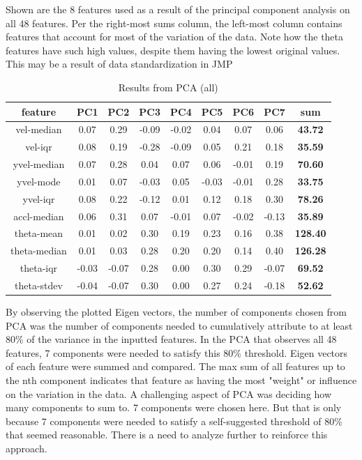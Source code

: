 \begin{table}[h!]
	\centering
	\caption{Results from PCA (all)}
	{\small Shown are the 8 features used as a result of the principal component analysis on all 48 features. Per the right-most sums column, the left-most column contains features that account for most of the variation of the data. Note how the theta features have such high values, despite them having the lowest original values. This may be a result of data standardization in JMP}
	\bigskip
	\label{tab:pca-all-results}
	\begin{tabular}{|c|c|c|c|c|c|c|c|c|}
		\hline
		\textbf{feature} & \textbf{PC1} & \textbf{PC2} & \textbf{PC3} & \textbf{PC4} & \textbf{PC5} & \textbf{PC6} & \textbf{PC7} & \textbf{sum} \\
		\hline
		vel-median & 0.07 & 0.29 & -0.09 & -0.02 & 0.04 & 0.07 & 0.06 & \textbf{43.72} \\
		vel-iqr & 0.08 & 0.19 & -0.28 & -0.09 & 0.05 & 0.21 & 0.18 & \textbf{35.59} \\
		yvel-median & 0.07 & 0.28 & 0.04 & 0.07 & 0.06 & -0.01 & 0.19 & \textbf{70.60} \\
		yvel-mode & 0.01 & 0.07 & -0.03 & 0.05 & -0.03 & -0.01 & 0.28 & \textbf{33.75} \\
		yvel-iqr & 0.08 & 0.22 & -0.12 & 0.01 & 0.12 & 0.18 & 0.30 & \textbf{78.26} \\
		accl-median & 0.06 & 0.31 & 0.07 & -0.01 & 0.07 & -0.02 & -0.13 & \textbf{35.89} \\
		theta-mean & 0.01 & 0.02 & 0.30 & 0.19 & 0.23 & 0.16 & 0.38 & \textbf{128.40} \\
		theta-median & 0.01 & 0.03 & 0.28 & 0.20 & 0.20 & 0.14 & 0.40 & \textbf{126.28} \\
		theta-iqr & -0.03 & -0.07 & 0.28 & 0.00 & 0.30 & 0.29 & -0.07 & \textbf{69.52} \\
		theta-stdev & -0.04 & -0.07 & 0.30 & 0.00 & 0.27 & 0.24 & -0.18 & \textbf{52.62} \\
		\hline
	\end{tabular}
\end{table}

By observing the plotted Eigen vectors, the number of components chosen from PCA was the number of components needed to cumulatively attribute to at least 80\% of the variance in the inputted features. In the PCA that observes all 48 features, 7 components were needed to satisfy this 80\% threshold. Eigen vectors of each feature were summed and compared. The max sum of all features up to the nth component indicates that feature as having the most "weight" or influence on the variation in the data. A challenging aspect of PCA was deciding how many components to sum to. 7 components were chosen here. But that is only because 7 components were needed to satisfy a self-suggested threshold of 80\% that seemed reasonable. There is a need to analyze further to reinforce this approach.

